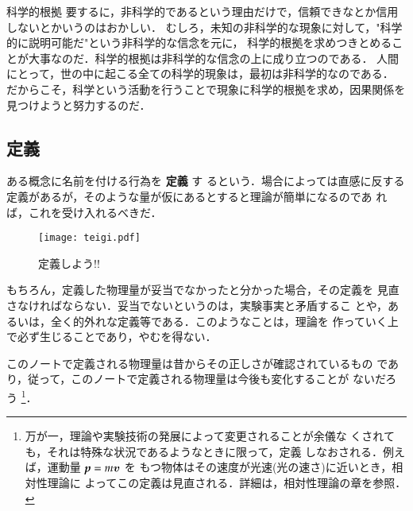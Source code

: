 \begin{memo}{科学的根拠}
                要するに，非科学的であるという理由だけで，信頼できなとか信用しないとかいうのはおかしい．
                むしろ，未知の非科学的な現象に対して，"科学的に説明可能だ"という非科学的な信念を元に，
                科学的根拠を求めつきとめることが大事なのだ．科学的根拠は非科学的な信念の上に成り立つのである．
                人間にとって，世の中に起こる全ての科学的現象は，最初は非科学的なのである．
                だからこそ，科学という活動を行うことで現象に科学的根拠を求め，因果関係を見つけようと努力するのだ．
            \end{memo}

        \subsection{定義}
                ある概念に名前を付ける行為を \textbf{定義} す
                るという．場合によっては直感に反する
                定義があるが，そのような量が仮にあるとすると理論が簡単になるのであ
                れば，これを受け入れるべきだ．
                    \begin{figure}[hbt]
                        \begin{center}
                            \texttt{[image: teigi.pdf]}
                            \caption{定義しよう!!}
                            \label{fig:teigi}
                        \end{center}
                    \end{figure}

                もちろん，定義した物理量が妥当でなかったと分かった場合，その定義を
                見直さなければならない．妥当でないというのは，実験事実と矛盾するこ
                とや，あるいは，全く的外れな定義等である．このようなことは，理論を
                作っていく上で必ず生じることであり，やむを得ない．

                このノートで定義される物理量は昔からその正しさが確認されているもの
                であり，従って，このノートで定義される物理量は今後も変化することが
                ないだろう
                    \footnote{
                        万が一，理論や実験技術の発展によって変更されることが余儀な
                        くされても，それは特殊な状況であるようなときに限って，定義
                        しなおされる．例えば，運動量  $\textit{\textbf{p}} = m\boldsymbol{v}$ を
                        もつ物体はその速度が光速(光の速さ)に近いとき，相対性理論に
                        よってこの定義は見直される．詳細は，相対性理論の章を参照．
                    }．

